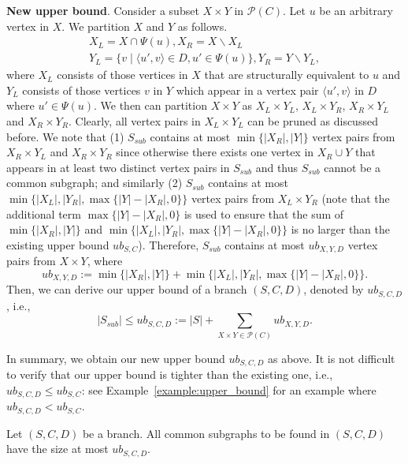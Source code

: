 \smallskip
\noindent\textbf{New upper bound}. Consider a subset $X\times Y $ in $\mathcal{P}(C)$. Let $u$ be an arbitrary vertex in $X$. We partition $X$ and $Y$ as follows.
\begin{eqnarray}
 X_L=X\cap \Psi(u), X_R=X\backslash X_L\\
 Y_L=\{v\mid \langle u',v \rangle\in D, u'\in \Psi(u)\}, Y_R=Y\backslash Y_L,   
\end{eqnarray}
where $X_L$ consists of those vertices in $X$ that are structurally equivalent to $u$ and $Y_L$ consists of those vertices $v$ in $Y$ which appear  in a vertex pair $\langle u',v \rangle$ in $D$ where $u'\in \Psi(u)$. We then can partition $X\times Y$ as $X_L\times Y_L$, $X_L\times Y_R$, $ X_R\times Y_L$ and $X_R\times Y_R$. Clearly, all vertex pairs in $X_L\times Y_L$ can be pruned as discussed before. 
%
We note that (1) $S_{sub}$ contains at most $\min\{|X_R|,|Y|\}$ vertex pairs from $X_R\times Y_L$ and $X_R\times Y_R$ since otherwise there exists one vertex in $X_R\cup Y$ that appears in at least two distinct vertex pairs in $S_{sub}$ and thus $S_{sub}$ cannot be a common subgraph; and similarly (2) $S_{sub}$ contains at most $\min\{|X_L|,|Y_R|,\max\{|Y|-|X_R|,0\}\}$ vertex pairs from $X_L\times Y_R$ (note that the additional term $\max\{|Y|-|X_R|,0\}$ is used to ensure that the sum of $\min\{|X_R|,|Y|\}$ and $\min\{|X_L|,|Y_R|,\max\{|Y|-|X_R|,0\}\}$ is no larger than the existing upper bound $ub_{S,C}$). Therefore, $S_{sub}$ contains at most $ub_{X,Y,D}$ vertex pairs from $X\times Y$, where
\begin{equation}
    ub_{X,Y,D}:=\min\{|X_R|,|Y|\}+\min\{|X_L|,|Y_R|,\max\{|Y|-|X_R|,0\}\}.
\end{equation}
Then, we can derive our upper bound of a branch $(S,C,D)$, denoted by $ub_{S,C,D}$, i.e.,
\begin{equation}
    |S_{sub}|\leq ub_{S,C,D}:=|S|+\sum_{X\times Y\in \mathcal{P}(C)} ub_{X,Y,D}.
\end{equation}

In summary, we obtain our new upper bound $ub_{S,C,D}$ as {\chengC above}. It is {\chengC not difficult} to verify that our upper bound is tighter than the existing one, i.e., $ub_{S,C,D}\leq ub_{S,C}$: see Example~\ref{example:upper_bound} for an example where $ub_{S,C,D} < ub_{S,C}$.  
\begin{lemma}
    \label{lemma:upper_bound}
    Let $(S,C,D)$ be a branch. All common subgraphs to be found in $(S,C,D)$ have the size at most $ub_{S,C,D}$.
\end{lemma}

